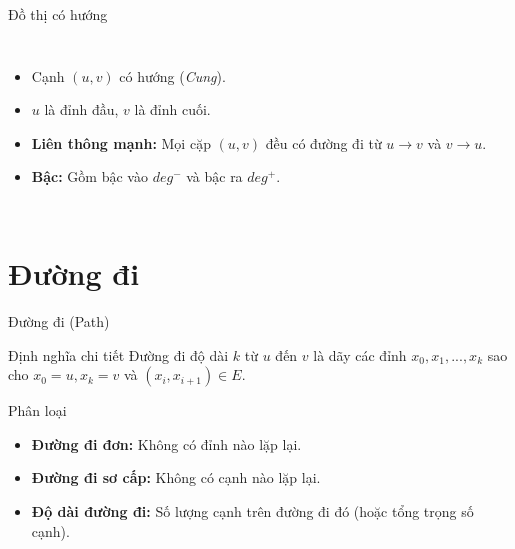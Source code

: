 \documentclass{beamer}
\begin{document}
\begin{frame}{Đồ thị có hướng}

\begin{columns}

\begin{itemize}
\item Cạnh $(u,v)$ có hướng (\textit{Cung}).
\item $u$ là đỉnh đầu, $v$ là đỉnh cuối.
\item \textbf{Liên thông mạnh:} Mọi cặp $(u, v)$ đều có đường đi từ $u \to v$ và $v \to u$.
\item \textbf{Bậc:} Gồm bậc vào $deg^-$ và bậc ra $deg^+$.
\end{itemize}



\end{columns}

\end{frame}

\section{Đường đi}

\begin{frame}{Đường đi (Path)}

\begin{block}{Định nghĩa chi tiết}
Đường đi độ dài $k$ từ $u$ đến $v$ là dãy các đỉnh $x_0, x_1, ..., x_k$ sao cho $x_0 = u, x_k = v$ và $(x_i, x_{i+1}) \in E$.
\end{block}

\pause

\begin{exampleblock}{Phân loại}
\begin{itemize}
    \item \textbf{Đường đi đơn:} Không có đỉnh nào lặp lại.
    \item \textbf{Đường đi sơ cấp:} Không có cạnh nào lặp lại.
    \item \textbf{Độ dài đường đi:} Số lượng cạnh trên đường đi đó (hoặc tổng trọng số cạnh).
\end{itemize}
\end{exampleblock}

\end{frame}
\end{document}
